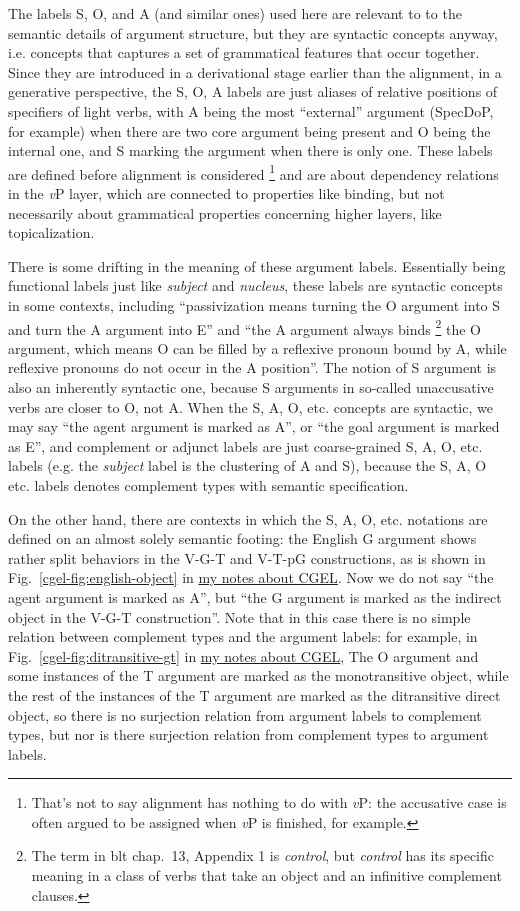 \documentclass[UTF8, a4paper, oneside, scheme=plain]{ctexart}
\newcommand*{\citechap}[1]{chap.~{#1}}
\newcommand*{\citefig}[1]{Fig.~{#1}}
\newcommand*{\term}[1]{\emph{#1}}
\newcommand*{\vP}{\textit{v}P}
\newcommand{\cgel}{\href{../English/cambridge.pdf}{my notes about CGEL}}
\begin{document}
The labels S, O, and A (and similar ones) 
used here are relevant to to the semantic details of argument structure,
but they are syntactic concepts anyway,
i.e. concepts that captures a set of grammatical features that occur together.
Since they are introduced in a derivational stage earlier than the alignment,
in a generative perspective,
the S, O, A labels are just aliases of relative positions of specifiers of light verbs, 
with A being the most ``external'' argument (SpecDoP, for example) 
when there are two core argument being present and O being the internal one, 
and S marking the argument when there is only one. 
These labels are defined before alignment is considered%
\footnote{
    That's not to say alignment has nothing to do with \vP:
    the accusative case is often argued to be assigned when \vP{} is finished, for example. 
}
and are about dependency relations in the \vP{} layer, 
which are connected to properties like binding,
but not necessarily about grammatical properties concerning higher layers, 
like topicalization.

There is some drifting in the meaning of these argument labels.
Essentially being functional labels just like \term{subject} and \term{nucleus},
these labels are syntactic concepts in some contexts,
including ``passivization means turning the O argument into S and turn the A argument into E''
and ``the A argument always binds%
\footnote{
    The term in \ac{blt} \citechap{13}, Appendix 1 is \term{control},
    but \term{control} has its specific meaning in a class of verbs 
    that take an object and an infinitive complement clauses.
}
the O argument, which means O can be filled by a reflexive pronoun bound by A,
while reflexive pronouns do not occur in the A position''.
The notion of S argument is also an inherently syntactic one,
because S arguments in so-called unaccusative verbs are closer to O, not A.
When the S, A, O, etc. concepts are syntactic,
we may say ``the agent argument is marked as A'',
or ``the goal argument is marked as E'',
and complement or adjunct labels are just coarse-grained S, A, O, etc. labels
(e.g. the \term{subject} label is the clustering of A and S), 
because the S, A, O etc. labels denotes complement types with semantic specification.

On the other hand, there are contexts in which the S, A, O, etc. notations 
are defined on an almost solely semantic footing:
the English G argument shows rather split behaviors in the V-G-T and V-T-pG constructions,
as is shown in \citefig{\ref{cgel-fig:english-object}} in \cgel.
Now we do not say ``the agent argument is marked as A'',
but ``the G argument is marked as the indirect object in the V-G-T construction''.
Note that in this case there is no simple relation between complement types and the argument labels:
for example, in \citefig{\ref{cgel-fig:ditransitive-gt}} in \cgel,
The O argument and some instances of the T argument are marked as the monotransitive object,
while the rest of the instances of the T argument are marked as the ditransitive direct object,
so there is no surjection relation from argument labels to complement types,
but nor is there surjection relation from complement types to argument labels.
\end{document}
